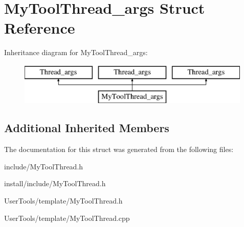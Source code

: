 \hypertarget{structMyToolThread__args}{\section{My\-Tool\-Thread\-\_\-args Struct Reference}
\label{structMyToolThread__args}
}
Inheritance diagram for My\-Tool\-Thread\-\_\-args\-:\begin{figure}[H]
\begin{center}
\leavevmode
\includegraphics[height=2.000000cm]{structMyToolThread__args}
\end{center}
\end{figure}
\subsection*{Additional Inherited Members}


The documentation for this struct was generated from the following files\-:\begin{DoxyCompactItemize}
\item 
include/My\-Tool\-Thread.\-h\item 
install/include/My\-Tool\-Thread.\-h\item 
User\-Tools/template/My\-Tool\-Thread.\-h\item 
User\-Tools/template/My\-Tool\-Thread.\-cpp\end{DoxyCompactItemize}
